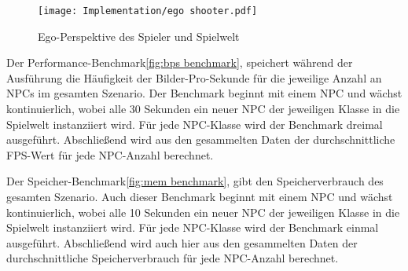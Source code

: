 \begin{figure}[h]
  \centering
  \texttt{[image: Implementation/ego shooter.pdf]}
	\captionsetup{justification=justified, format=plain}
  \caption{Ego-Perspektive des Spieler und Spielwelt}
  \label{fig:ego shooter}
\end{figure}

Der Performance-Benchmark\ref{fig:bps benchmark}, speichert während der Ausführung die Häufigkeit der Bilder-Pro-Sekunde für die jeweilige Anzahl an NPCs im gesamten Szenario. Der Benchmark beginnt mit einem NPC und wächst kontinuierlich, wobei alle 30 Sekunden ein neuer NPC der jeweiligen Klasse in die Spielwelt instanziiert wird. Für jede NPC-Klasse wird der Benchmark dreimal ausgeführt. Abschlie\ss{}end wird aus den gesammelten Daten der durchschnittliche FPS-Wert für jede NPC-Anzahl berechnet.

Der Speicher-Benchmark\ref{fig:mem benchmark}, gibt den Speicherverbrauch des gesamten Szenario. Auch dieser Benchmark beginnt mit einem NPC und wächst kontinuierlich, wobei alle 10 Sekunden ein neuer NPC der jeweiligen Klasse in die Spielwelt instanziiert wird. Für jede NPC-Klasse wird der Benchmark einmal ausgeführt. Abschlie\ss{}end wird auch hier aus den gesammelten Daten der durchschnittliche Speicherverbrauch für jede NPC-Anzahl berechnet.
